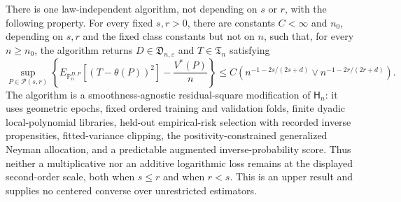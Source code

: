 There is one law-independent algorithm, not depending on \(s\) or \(r\), with the following property.  For every fixed \(s,r>0\), there are constants \(C<\infty\) and \(n_0\), depending on \(s,r\) and the fixed class constants but not on \(n\), such that, for every \(n\geq n_0\), the algorithm returns \(D\in\mathfrak D_{n,\varepsilon}\) and \(T\in\mathfrak T_n\) satisfying
\[
\sup_{P\in\mathcal P(s,r)}
\left\{
E_{\mathbb P_n^{D,P}}[(T-\theta(P))^2]-\frac{V^*(P)}n
\right\}
\leq C\left(
n^{-1-2s/(2s+d)}\vee n^{-1-2r/(2r+d)}
\right).
\]
The algorithm is a smoothness-agnostic residual-square modification of \(\mathsf H_n\): it uses geometric epochs, fixed ordered training and validation folds, finite dyadic local-polynomial libraries, held-out empirical-risk selection with recorded inverse propensities, fitted-variance clipping, the positivity-constrained generalized Neyman allocation, and a predictable augmented inverse-probability score.  Thus neither a multiplicative nor an additive logarithmic loss remains at the displayed second-order scale, both when \(s\leq r\) and when \(r<s\).  This is an upper result and supplies no centered converse over unrestricted estimators.